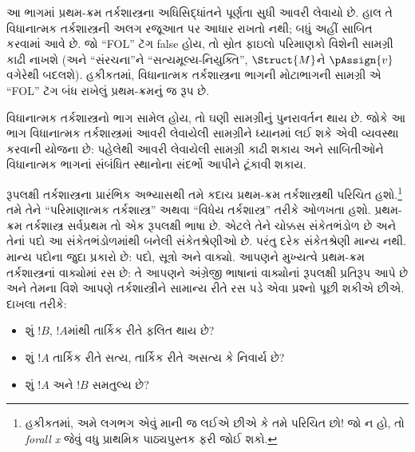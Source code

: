 
\label{guunit:OLP-0138}


\begin{editorial}
  આ ભાગમાં પ્રથમ-ક્રમ તર્કશાસ્ત્રના અધિસિદ્ધાંતને પૂર્ણતા સુધી આવરી
  લેવાયો છે. હાલ તે વિધાનાત્મક તર્કશાસ્ત્રની અલગ રજૂઆત પર આધાર રાખતો
  નથી; બધું અહીં સાબિત કરવામાં આવે છે. જો ``FOL'' ટૅગ false હોય, તો
  સ્રોત ફાઇલો પરિમાણકો વિશેની સામગ્રી કાઢી નાખશે (અને
  ``સંરચના''ને ``સત્યમૂલ્ય-નિયુક્તિ'', $\Struct{M}$ને $\pAssign{v}$
  વગેરેથી બદલશે). હકીકતમાં, વિધાનાત્મક તર્કશાસ્ત્રના ભાગની મોટાભાગની
  સામગ્રી એ ``FOL'' ટૅગ બંધ રાખેલું પ્રથમ-ક્રમનું જ રૂપ છે.

  વિધાનાત્મક તર્કશાસ્ત્રનો ભાગ સામેલ હોય, તો ઘણી સામગ્રીનું પુનરાવર્તન
  થાય છે. જોકે આ ભાગ વિધાનાત્મક તર્કશાસ્ત્રમાં આવરી લેવાયેલી સામગ્રીને
  ધ્યાનમાં લઈ શકે એવી વ્યવસ્થા કરવાની યોજના છે: પહેલેથી આવરી લેવાયેલી
  સામગ્રી કાઢી શકાય અને સાબિતીઓને વિધાનાત્મક ભાગનાં સંબંધિત સ્થાનોના
  સંદર્ભો આપીને ટૂંકાવી શકાય.
\end{editorial}

\begingroup
\makeatletter{}\makeatother

\label{guunit:OLP-0139}


\begingroup
\makeatletter{}\makeatother


\label{guunit:OLP-0140}


રૂપલક્ષી તર્કશાસ્ત્રના પ્રારંભિક અભ્યાસથી તમે કદાચ પ્રથમ-ક્રમ
તર્કશાસ્ત્રથી પરિચિત હશો.\footnote{હકીકતમાં, અમે લગભગ એવું માની જ
લઈએ છીએ કે તમે પરિચિત છો!{} જો ન હો, તો \emph{forall x}
\citep{Magnus2021} જેવું વધુ પ્રાથમિક પાઠ્યપુસ્તક ફરી જોઈ શકો.} તમે તેને
``પરિમાણાત્મક તર્કશાસ્ત્ર'' અથવા ``વિધેય તર્કશાસ્ત્ર'' તરીકે ઓળખતા
હશો. પ્રથમ-ક્રમ તર્કશાસ્ત્ર સર્વપ્રથમ તો એક રૂપલક્ષી ભાષા છે. એટલે
તેને ચોક્કસ સંકેતભંડોળ છે અને તેનાં પદો આ સંકેતભંડોળમાંથી બનેલી
સંકેતશ્રેણીઓ છે. પરંતુ દરેક સંકેતશ્રેણી માન્ય નથી. માન્ય પદોના જુદા
પ્રકારો છે: પદો, સૂત્રો અને વાક્યો. આપણને મુખ્યત્વે
પ્રથમ-ક્રમ તર્કશાસ્ત્રનાં વાક્યોમાં રસ છે: તે આપણને અંગ્રેજી
ભાષાનાં વાક્યોનાં રૂપલક્ષી પ્રતિરૂપ આપે છે અને તેમના વિશે આપણે
તર્કશાસ્ત્રીને સામાન્ય રીતે રસ પડે એવા પ્રશ્નો પૂછી શકીએ છીએ. દાખલા
તરીકે:
\begin{itemize}
    \item શું $!B$, $!A$માંથી તાર્કિક રીતે ફલિત થાય છે?
    \item શું $!A$ તાર્કિક રીતે સત્ય, તાર્કિક રીતે અસત્ય કે
નિવાર્ય છે?
    \item શું $!A$ અને $!B$ સમતુલ્ય છે?
\end{itemize}

